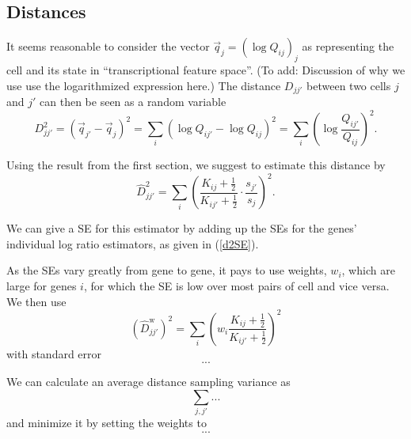 \documentclass[fleqn]{article}
\begin{document}
\subsection*{Distances}

It seems reasonable to consider the vector $\vec q_j = \left( \log Q_{ij} \right)_j$ as representing the cell and its state in
``transcriptional feature space''. (To add: Discussion of why we use use the logarithmized expression here.) The distance $D_{jj'}$ between
two cells $j$ and $j'$ can then be seen as a random variable
\[ D_{jj'}^2 = (\vec q_{j'} - \vec q_{j})^2 = \sum_i\left( \log Q_{ij'} - \log Q_{ij} \right)^2 = \sum_i\left( \log\frac{Q_{ij'}}{Q_{ij}} \right)^2. \]

Using the result from the first section, we suggest to estimate this distance by
\[ \hat D_{jj'}^2 = \sum_i\left( \frac{K_{ij}+\frac{1}{2}}{K_{ij'}+\frac{1}{2}} \cdot \frac{s_{j'}}{s_j} \right)^2. \]

We can give a SE for this estimator by adding up the SEs for the genes' individual log ratio estimators, as given in (\ref{d2SE}).

As the SEs vary greatly from gene to gene, it pays to use weights, $w_i$, which are large for genes $i$, for which the SE is low over
most pairs of cell and vice versa. We then use
\[ (\hat D^\text{w}_{jj'})^2 = \sum_i\left( w_i \frac{K_{ij}+\frac{1}{2}}{K_{ij'}+\frac{1}{2}} \right)^2 \]
with standard error
\[ ... \]

We can calculate an average distance sampling variance as
\[ \sum_{j,j'} ... \]
and minimize it by setting the weights to
\[ ... \]
\end{document}
